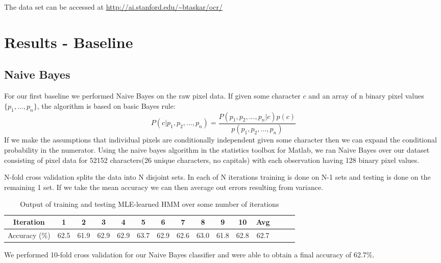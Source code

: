 \documentclass{article} %
\begin{document}
The data set can be accessed at \url{http://ai.stanford.edu/~btaskar/ocr/}

\section{Results - Baseline}
\subsection{Naive Bayes}
For our first baseline we performed Naive Bayes on the raw pixel data.
If given some character $c$ and an array of n binary pixel values $\{p_1, ..., p_n\}$, the algorithm is based on basic Bayes rule:
$$P(c|p_1, p_2, ... , p_n) = \frac{P(p_1, p_2, ... , p_n|c)p(c)}{p(p_1, p_2, ... , p_n)}$$
If we make the assumptions that individual pixels are conditionally independent given some character then we can expand the conditional probability in the numerator. Using the naive bayes algorithm in the statistics toolbox for Matlab, we ran Naive Bayes over our dataset consisting of pixel data for 52152 characters(26 unique characters, no capitals) with each observation having 128 binary pixel values.

N-fold cross validation splits the data into N disjoint sets. In each of N iterations training is done on N-1 sets and testing is done on the remaining 1 set. If we take the mean accuracy we can then average out errors resulting from variance.


\begin{table}[h]
\centering
\begin{tabular}{|c|c|c|c|c|c|c|c|c|c|c|c|c|c|c|}
\hline
Iteration & 1 & 2 & 3 & 4 & 5 & 6 & 7 & 8 & 9 & 10 & Avg \\
\hline
Accuracy (\%) & 62.5 & 61.9 & 62.9 & 62.9 & 63.7 & 62.9 & 62.6 & 63.0 & 61.8 & 62.8 & 62.7\\
\hline
\end{tabular}
\caption{Output of training and testing MLE-learned HMM over some number of iterations}
\label{tab:mid-logr-results}
\end{table}

We performed 10-fold cross validation for our Naive Bayes classifier and were able to obtain a final accuracy of 62.7\%.
\end{document}

